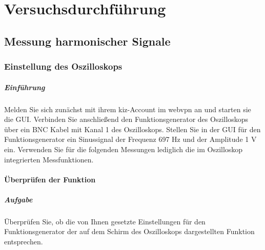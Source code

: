 \documentclass[10pt]{scrreprt}
\begin{document}
        \chapter{Versuchsdurchführung}
        \section{Messung harmonischer Signale}
        \subsection{Einstellung des Oszilloskops}
        \paragraph{Einführung}
        Melden Sie sich zunächst mit ihrem kiz-Account im webvpn an und starten sie die GUI.\@
        Verbinden Sie anschließend den Funktionsgenerator des Oszilloskops über ein BNC Kabel
        mit Kanal 1 des Oszilloskops. Stellen Sie in der GUI für den Funktionsgenerator ein Sinussignal der Frequenz 697 Hz und der Amplitude 1 V ein. Verwenden Sie für die folgenden
        Messungen lediglich die im Oszilloskop integrierten Messfunktionen.

        \subsubsection{Überprüfen der Funktion}
        \paragraph{Aufgabe}
        Überprüfen Sie, ob die von Ihnen gesetzte Einstellungen für den Funktionsgenerator
        der auf dem Schirm des Oszilloskops dargestellten Funktion entsprechen.
\end{document}
